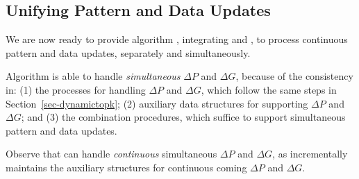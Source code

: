 \subsection{Unifying Pattern and Data Updates}
\label{subsec-completePG}

We are now ready to provide algorithm \inc, integrating \incp and \incd,  to process continuous pattern and data updates, separately and simultaneously.

Algorithm \inc is able to handle {\em simultaneous} $\Delta P$ and $\Delta G$, because of the consistency in:
(1) the processes for handling $\Delta P$ and $\Delta G$, which follow the same steps in Section~\ref{sec-dynamictopk};
(2) auxiliary data structures for supporting $\Delta P$ and $\Delta G$; and
(3) the combination procedures, which suffice to support simultaneous pattern and data updates.

Observe that \inc can handle {\em continuous} simultaneous $\Delta P$ and $\Delta G$,
as \inc incrementally maintains the auxiliary structures for continuous coming $\Delta P$ and $\Delta G$.
